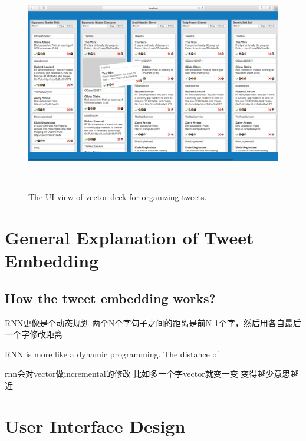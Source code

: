 \begin{figure}[thb!]
    \includegraphics[width= \textwidth]{images/vector_deck}
   \caption{The UI view of vector deck for organizing tweets.  } ~\label{fig: vector_deck}
\end{figure}


\section{General Explanation of Tweet Embedding}

\subsection{How the tweet embedding works?}


RNN更像是个动态规划
两个N个字句子之间的距离是前N-1个字，然后用各自最后一个字修改距离



RNN is more like a dynamic programming. The distance of 

rnn会对vector做incremental的修改
比如多一个字vector就变一变
变得越少意思越近





\subsection{}






\section{User Interface Design}




